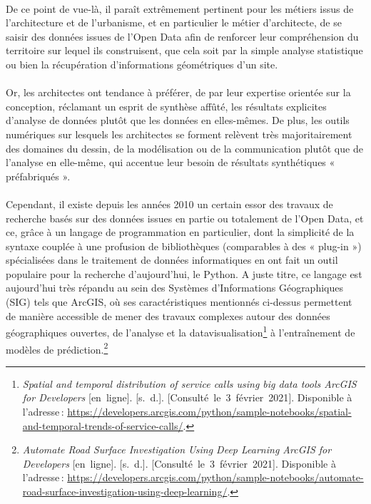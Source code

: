 \documentclass[
  11pt,
  french,
]{article}
\begin{document}
~\\
De ce point de vue-là, il paraît extrêmement pertinent pour les métiers
issus de l'architecture et de l'urbanisme, et en particulier le métier
d'architecte, de se saisir des données issues de l'Open Data afin de
renforcer leur compréhension du territoire sur lequel ils construisent,
que cela soit par la simple analyse statistique ou bien la récupération
d'informations géométriques d'un site.\\
~\\
Or, les architectes ont tendance à préférer, de par leur expertise
orientée sur la conception, réclamant un esprit de synthèse affûté, les
résultats explicites d'analyse de données plutôt que les données en
elles-mêmes. De plus, les outils numériques sur lesquels les architectes
se forment relèvent très majoritairement des domaines du dessin, de la
modélisation ou de la communication plutôt que de l'analyse en
elle-même, qui accentue leur besoin de résultats synthétiques «
préfabriqués ».\\
~\\
Cependant, il existe depuis les années 2010 un certain essor des travaux
de recherche basés sur des données issues en partie ou totalement de
l'Open Data, et ce, grâce à un langage de programmation en particulier,
dont la simplicité de la syntaxe couplée à une profusion de
bibliothèques (comparables à des « plug-in ») spécialisées dans le
traitement de données informatiques en ont fait un outil populaire pour
la recherche d'aujourd'hui, le Python. A juste titre, ce langage est
aujourd'hui très répandu au sein des Systèmes d'Informations
Géographiques (SIG) tels que ArcGIS, où ses caractéristiques mentionnés
ci-dessus permettent de manière accessible de mener des travaux
complexes autour des données géographiques ouvertes, de l'analyse et la
datavisualisation\footnote{\emph{Spatial and temporal distribution of
  service calls using big data tools \textbar{} ArcGIS for Developers}
  {[}en~ligne{]}. {[}s.~d.{]}. {[}Consulté~le~3~février~2021{]}.
  Disponible à l'adresse\,:
  \url{https://developers.arcgis.com/python/sample-notebooks/spatial-and-temporal-trends-of-service-calls/}.}
à l'entraînement de modèles de prédiction.\footnote{\emph{Automate Road
  Surface Investigation Using Deep Learning \textbar{} ArcGIS for
  Developers} {[}en~ligne{]}. {[}s.~d.{]}.
  {[}Consulté~le~3~février~2021{]}. Disponible à l'adresse\,:
  \url{https://developers.arcgis.com/python/sample-notebooks/automate-road-surface-investigation-using-deep-learning/}.}\\
\end{document}
